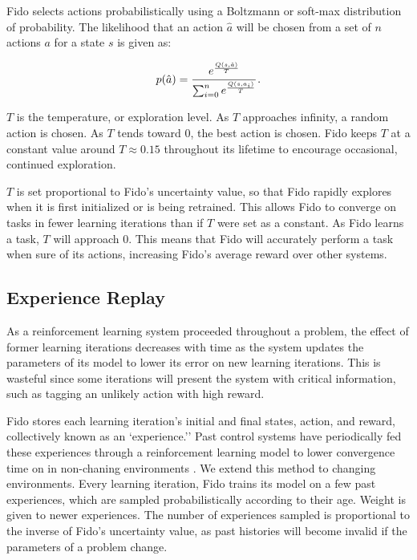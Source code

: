 Fido selects actions probabilistically using a Boltzmann or soft-max distribution of probability.
The likelihood that an action $\hat{a}$ will be chosen from a set of $n$ actions $a$ for a state $s$ is given as:

\begin{equation}
	p(\hat{a}) = \cfrac{e^{\frac{Q(s, \hat{a})}{T}}}{\sum_{i=0}^{n}e^{\frac{Q(s, a_i)}{T}}}
	\,.
	\label{equ::boltzmann}
\end{equation}

$T$ is the temperature, or exploration level.
As $T$ approaches infinity, a random action is chosen.
As $T$ tends toward 0, the best action is chosen.
Fido keeps $T$ at a constant value around $T \approx 0.15$ throughout its lifetime to encourage occasional, continued exploration.

$T$ is set proportional to Fido's uncertainty value, so that Fido rapidly explores when it is first initialized or is being retrained. This allows Fido to converge on tasks in fewer learning iterations than if $T$ were set as a constant. As Fido learns a task, $T$ will approach 0. This means that Fido will accurately perform a task when sure of its actions, increasing Fido's average reward over other systems.

\subsection{Experience Replay}

As a reinforcement learning system proceeded throughout a problem, the effect of former learning iterations decreases with time as the system updates the parameters of its model to lower its error on new learning iterations. This is wasteful since some iterations will present the system with critical information, such as tagging an unlikely action with high reward.

Fido stores each learning iteration's initial and final states, action, and reward, collectively known as an `experience.'' Past control systems have periodically fed these experiences through a reinforcement learning model to lower convergence time on in non-chaning environments \cite{adam}. We extend this method to changing environments. Every learning iteration, Fido trains its model on a few past experiences, which are sampled probabilistically according to their age. Weight is given to newer experiences. The number of experiences sampled is proportional to the inverse of Fido's uncertainty value, as past histories will become invalid if the parameters of a problem change.

